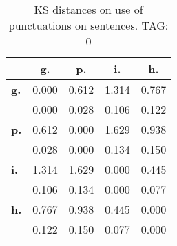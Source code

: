 \begin{table}[h!]
\begin{center}
\begin{tabular}{| l || c | c | c | c |}\hline
 & {\bf g.} & {\bf p.} & {\bf i.} & {\bf h.} \\\hline\hline
{\bf g.} & 0.000 & 0.612 & 1.314 & 0.767 \\
{\bf } & 0.000 & 0.028 & 0.106 & 0.122 \\\hline
{\bf p.} & 0.612 & 0.000 & 1.629 & 0.938 \\
{\bf } & 0.028 & 0.000 & 0.134 & 0.150 \\\hline
{\bf i.} & 1.314 & 1.629 & 0.000 & 0.445 \\
{\bf } & 0.106 & 0.134 & 0.000 & 0.077 \\\hline
{\bf h.} & 0.767 & 0.938 & 0.445 & 0.000 \\
{\bf } & 0.122 & 0.150 & 0.077 & 0.000 \\\hline
\end{tabular}
\caption{KS distances on use of punctuations on sentences. TAG: 0}
\end{center}
\end{table}